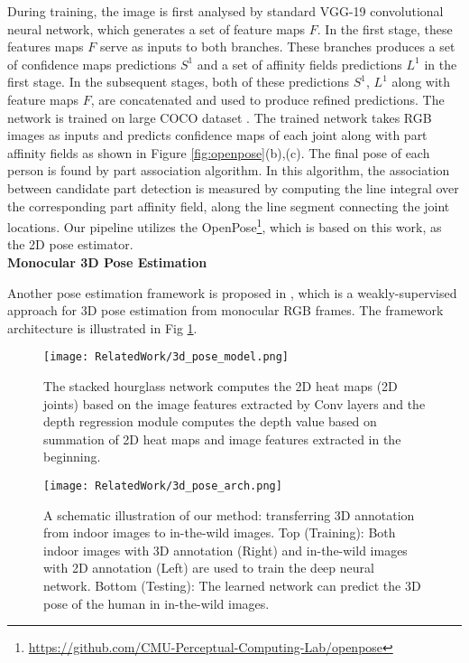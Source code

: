 During training, the image is first analysed by standard VGG-19 \cite{Vedaldi2015} convolutional neural network, which generates a set of feature maps $F$. In the first stage, these features maps $F$ serve as inputs to both branches. These branches produces a set of confidence maps predictions $S^{1}$ and a set of affinity fields predictions $L^{1}$ in the first stage. In the subsequent stages, both of these predictions $S^{1}$, $L^{1}$ along with feature maps $F$, are concatenated and used to produce refined predictions. The network is trained on large COCO dataset \cite{DBLP:journals/corr/LinMBHPRDZ14}. The trained network takes RGB images as inputs and predicts confidence maps of each joint along with part affinity fields as shown in Figure \ref{fig:openpose}(b),(c). The final pose of each person is found by part association algorithm. In this algorithm, the association between candidate part detection is measured by computing the line integral over the corresponding part affinity field, along the line segment connecting the joint locations. Our pipeline utilizes the OpenPose\footnote{\url{https://github.com/CMU-Perceptual-Computing-Lab/openpose}}, which is based on this work, as the 2D pose estimator. \\

\textbf{Monocular 3D Pose Estimation}

Another pose estimation framework is proposed in \cite{DBLP:journals/corr/ZhouH0XW17}, which is a weakly-supervised approach for 3D pose estimation from monocular RGB frames. The framework architecture is illustrated in Fig \ref{fig:3d_pose_model}. 

\begin{figure}[h!]
  \centering
  \texttt{[image: RelatedWork/3d\_pose\_model.png]}
  \caption{The stacked hourglass network computes the 2D heat maps (2D joints) based on the image
           features extracted by Conv layers and the depth regression module computes the depth value
           based on summation of 2D heat maps and image features extracted in the beginning.
           \cite{DBLP:journals/corr/ZhouH0XW17}}
  \label{fig:3d_pose_model}
\end{figure} 

\begin{figure}[h!]
  \centering
  \texttt{[image: RelatedWork/3d\_pose\_arch.png]}
  \caption{A schematic illustration of our method: transferring 3D annotation from indoor images to 
          in-the-wild images. Top (Training): Both indoor images with 3D annotation (Right) and 
          in-the-wild images with 2D annotation (Left) are used to train the deep neural network.
          Bottom (Testing): The learned network can predict the 3D pose of the human in in-the-wild
          images. \cite{DBLP:journals/corr/ZhouH0XW17}}
  \label{fig:3d_pose_arch}
\end{figure} 


